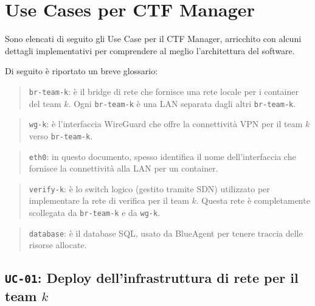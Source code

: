 \section{Use Cases per CTF Manager}\label{use-cases-per-ctf-manager}

Sono elencati di seguito gli Use Case per il CTF Manager, arricchito con
alcuni dettagli implementativi per comprendere al meglio l'architettura
del software.

Di seguito è riportato un breve glossario:

\begin{quote}
\passthrough{\lstinline!br-team-k!}: è il bridge di rete che fornisce
una rete locale per i container del team \(k\). Ogni
\passthrough{\lstinline!br-team-k!} è una LAN separata dagli altri
\passthrough{\lstinline!br-team-k!}.
\end{quote}

\begin{quote}
\passthrough{\lstinline!wg-k!}: è l'interfaccia WireGuard che offre la
connettività VPN per il team \(k\) verso
\passthrough{\lstinline!br-team-k!}.
\end{quote}

\begin{quote}
\passthrough{\lstinline!eth0!}: in questo documento, spesso identifica
il nome dell'interfaccia che fornisce la connettività alla LAN per un
container.
\end{quote}

\begin{quote}
\passthrough{\lstinline!verify-k!}: è lo switch logico (gestito tramite
SDN) utilizzato per implementare la rete di verifica per il team \(k\).
Questa rete è completamente scollegata da
\passthrough{\lstinline!br-team-k!} e da \passthrough{\lstinline!wg-k!}.
\end{quote}

\begin{quote}
\passthrough{\lstinline!database!}: è il database SQL, usato da
BlueAgent per tenere traccia delle risorse allocate.
\end{quote}

\subsection{\texorpdfstring{\texttt{UC-01}: Deploy dell'infrastruttura
di rete per il team
\(k\)}{UC-01: Deploy dell'infrastruttura di rete per il team k}}\label{uc-01-deploy-dellinfrastruttura-di-rete-per-il-team-k}

